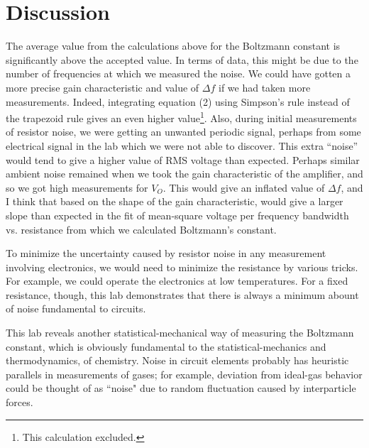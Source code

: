 \documentclass{article}
\begin{document}
\section{Discussion}

The average value from the calculations above for the Boltzmann
constant is significantly above the accepted value. In terms of
data, this might be due to the number of frequencies at which we
measured the noise. We could have gotten a more precise gain
characteristic and value of $\Delta f$ if we had taken more
measurements. Indeed, integrating equation (2) using Simpson's
rule instead of the trapezoid rule gives an even higher
value\footnote{This calculation excluded.}. Also, during initial
measurements of resistor noise, we were getting an unwanted
periodic signal, perhaps from some electrical signal in the lab
which we were not able to discover. This extra ``noise'' would
tend to give a higher value of RMS voltage than expected.
Perhaps similar ambient noise remained when we took the gain
characteristic of the amplifier, and so we got high measurements
for $V_O$. This would give an inflated value of $\Delta f$, and
I think that based on the shape of the gain characteristic,
would give a larger slope than expected in the fit of
mean-square voltage per frequency bandwidth vs. resistance from
which we calculated Boltzmann's constant.

To minimize the uncertainty caused by resistor noise in any
measurement involving electronics, we would need to minimize the
resistance by various tricks. For example, we could operate the
electronics at low temperatures. For a fixed resistance, though,
this lab demonstrates that there is always a minimum abount of
noise fundamental to circuits.

This lab reveals another statistical-mechanical way of measuring
the Boltzmann constant, which is obviously fundamental to the
statistical-mechanics and thermodynamics, of chemistry. Noise in
circuit elements probably has heuristic parallels in
measurements of gases; for example, deviation from ideal-gas
behavior could be thought of as ``noise" due to random
fluctuation caused by interparticle forces.
\end{document}
